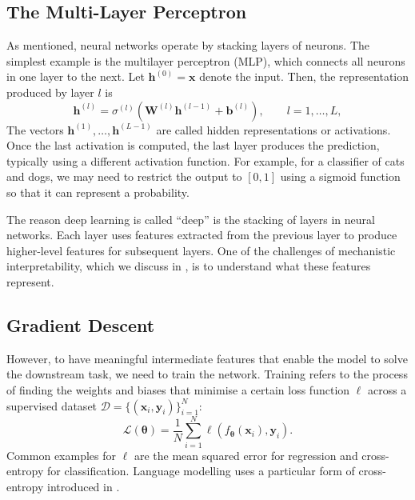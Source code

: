 \subsection{The Multi-Layer Perceptron}
As mentioned, neural networks operate by stacking layers of neurons. The simplest example is the multilayer perceptron (MLP), which connects all neurons in one layer to the next. Let $\mathbf{h}^{(0)}=\mathbf{x}$ denote the input. Then, the representation produced by layer $l$ is
\begin{equation}
    \mathbf{h}^{(l)} = \sigma^{(l)}\!\left(\mathbf{W}^{(l)}\mathbf{h}^{(l-1)} + \mathbf{b}^{(l)}\right),
    \qquad l=1,\ldots,L,
    \label{eq:feedforward_layer}
\end{equation}
The vectors $\mathbf{h}^{(1)},\ldots,\mathbf{h}^{(L-1)}$ are called hidden representations or activations. Once the last activation is computed, the last layer produces the prediction, typically using a different activation function. For example, for a classifier of cats and dogs, we may need to restrict the output to $[0, 1]$ using a sigmoid function so that it can represent a probability.

The reason deep learning is called ``deep'' is the stacking of layers in neural networks. Each layer uses features extracted from the previous layer to produce higher-level features for subsequent layers. One of the challenges of mechanistic interpretability, which we discuss in , is to understand what these features represent.

\subsection{Gradient Descent}
However, to have meaningful intermediate features that enable the model to solve the downstream task, we need to train the network. Training refers to the process of finding the weights and biases that minimise a certain loss function $\ell$ across a supervised dataset $\mathcal{D}=\{(\mathbf{x}_i,\mathbf{y}_i)\}_{i=1}^{N}$:
\begin{equation}
    \mathcal{L}(\boldsymbol{\theta})
    = \frac{1}{N}\sum_{i=1}^{N}
    \ell\!\left(f_{\boldsymbol{\theta}}(\mathbf{x}_i),\mathbf{y}_i\right).
    \label{eq:empirical_loss}
\end{equation}
Common examples for $\ell$ are the mean squared error for regression and cross-entropy for classification. Language modelling uses a particular form of cross-entropy introduced in .

